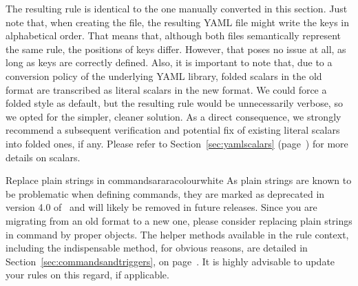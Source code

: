 
The resulting rule is identical to the one manually converted in this section. Just note that, when creating the file, the resulting YAML file might write the keys in alphabetical order. That means that, although both files semantically represent the same rule, the positions of keys differ. However, that poses no issue at all, as long as keys are correctly defined. Also, it is important to note that, due to a conversion policy of the underlying YAML library, folded scalars in the old format are transcribed as literal scalars in the new format. We could force a folded style as default, but the resulting rule would be unnecessarily verbose, so we opted for the simpler, cleaner solution. As a direct consequence, we strongly recommend a subsequent verification and potential fix of existing literal scalars into folded ones, if any. Please refer to Section~\ref{sec:yamlscalars} (page~\pageref{sec:yamlscalars}) for more details on scalars.

\begin{messagebox}{Replace plain strings in commands}{araracolour}{\icattention}{white}
As plain strings are known to be problematic when defining commands, they are marked as deprecated in version 4.0 of \arara\ and will likely be removed in future releases. Since you are migrating from an old format to a new one, please consider replacing plain strings in command by proper  objects. The helper methods available in the rule context, including the indispensable  method, for obvious reasons, are detailed in Section~\ref{sec:commandsandtriggers}, on page~\pageref{sec:commandsandtriggers}. It is highly advisable to update your rules on this regard, if applicable.
\end{messagebox}

